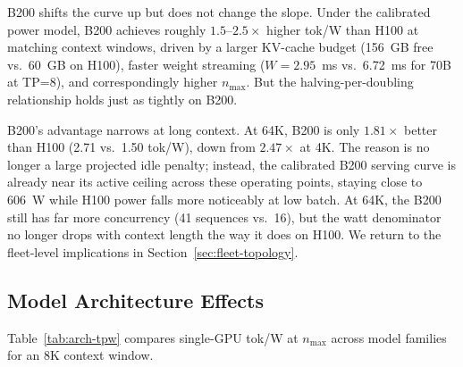 \documentclass[11pt,a4paper]{article}
\newcommand{\nmax}{n_{\max}}
\begin{document}
B200 shifts the curve up but does not change the slope.  Under the calibrated
power model, B200 achieves roughly $1.5$--$2.5\times$ higher tok/W than H100
at matching context windows,
driven by a larger KV-cache budget (156~GB free vs.\ 60~GB on H100), faster
weight streaming ($W = 2.95$~ms vs.\ 6.72~ms for 70B at TP=8), and correspondingly
higher $\nmax$.  But the halving-per-doubling relationship holds just as
tightly on B200.

B200's advantage narrows at long context.  At 64K, B200 is only
$1.81\times$ better than H100 (2.71 vs.\ 1.50 tok/W), down from $2.47\times$
at 4K.  The reason is no longer a large projected idle penalty; instead, the
calibrated B200 serving curve is already near its active ceiling across these
operating points, staying close to 606~W while H100 power falls more noticeably
at low batch.  At 64K, the B200 still has far more concurrency (41 sequences
vs.\ 16), but the watt denominator no longer drops with context length the way
it does on H100.  We return to the fleet-level
implications in Section~\ref{sec:fleet-topology}.

\subsection{Model Architecture Effects}
\label{sec:arch-effects}

Table~\ref{tab:arch-tpw} compares single-GPU tok/W at $\nmax$ across model
families for an 8K context window.
\end{document}
